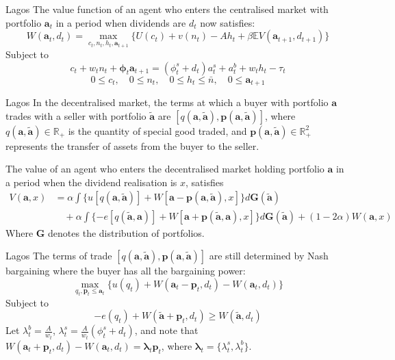 \documentclass[aspectratio=169,xcolor=dvipsnames]{beamer}
\begin{document}
\begin{frame}{Lagos}
    The value function of an agent who enters the centralised market with portfolio $\mathbf{a}_t$ in a period when dividends are $d_t$ now satisfies:
    \[
        W(\mathbf{a}_t, d_t) = \max_{c_t, n_t, h_t, \mathbf{a}_{t+1}} \{U(c_t) + v(n_t) - A h_t + \beta \mathbb{E} V(\mathbf{a}_{t+1}, d_{t+1})\}
    \]
    Subject to
    \[
        c_t + w_t n_t + \boldsymbol{\phi}_t \mathbf{a}_{t+1} = (\phi^s_t + d_t) a^s_t + a^b_t + w_t h_t - \tau_t
    \]
    \[
        0 \le c_t, \quad 0 \le n_t, \quad 0 \le h_t \le \bar n, \quad 0 \le \mathbf{a}_{t+1}
    \]
\end{frame}

\begin{frame}{Lagos}
    In the decentralised market, the terms at which a buyer with portfolio $\mathbf{a}$ trades with a seller with portfolio $\tilde{\mathbf{a}}$ are $[q(\mathbf{a}, \tilde{\mathbf{a}}), \mathbf{p}(\mathbf{a}, \tilde{\mathbf{a}})]$, where $q(\mathbf{a}, \tilde{\mathbf{a}}) \in \mathbb{R}_+$ is the quantity of special good traded, and $\mathbf{p}(\mathbf{a}, \tilde{\mathbf{a}}) \in \mathbb{R}^2_+$ represents the transfer of assets from the buyer to the seller.

    The value of an agent who enters the decentralised market holding portfolio $\mathbf{a}$ in a period when the dividend realisation is $x$, satisfies
    \begin{align*}
        V(\mathbf{a}, x) &= \alpha \int \{u[q(\mathbf{a}, \tilde{\mathbf{a}})] + W[\mathbf{a} - \mathbf{p}(\mathbf{a}, \tilde{\mathbf{a}}), x]\} d\mathbf{G}(\tilde{\mathbf{a}}) \\
        &\quad + \alpha \int \{-e[q(\tilde{\mathbf{a}}, \mathbf{a})] + W[\mathbf{a} + \mathbf{p}(\tilde{\mathbf{a}}, \mathbf{a}), x]\} d\mathbf{G}(\tilde{\mathbf{a}}) + (1 - 2\alpha) W(\mathbf{a}, x)
    \end{align*}
    Where $\mathbf{G}$ denotes the distribution of portfolios.
\end{frame}

\begin{frame}{Lagos}
    The terms of trade $[q(\mathbf{a}, \tilde{\mathbf{a}}), \mathbf{p}(\mathbf{a}, \tilde{\mathbf{a}})]$ are still determined by Nash bargaining where the buyer has all the bargaining power:
    \[
        \max_{q_t, \mathbf{p}_t \le \mathbf{a}_t} \{u(q_t) + W(\mathbf{a}_t - \mathbf{p}_t, d_t) - W(\mathbf{a}_t, d_t)\}
    \]
    Subject to
    \[
        -e(q_t) + W(\tilde{\mathbf{a}} + \mathbf{p}_t, d_t) \ge W(\tilde{\mathbf{a}}, d_t)
    \]
    Let $\lambda^b_t = \frac{A}{w_t}$, $\lambda^s_t = \frac{A}{w_t}(\phi^s_t + d_t)$, and note that $W(\mathbf{a}_t + \mathbf{p}_t, d_t) - W(\mathbf{a}_t, d_t) = \boldsymbol{\lambda}_t \mathbf{p}_t$, where $\boldsymbol{\lambda}_t = \{\lambda^s_t, \lambda^b_t\}$.
\end{frame}
\end{document}
